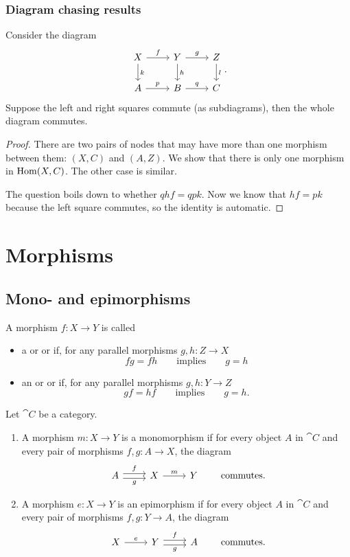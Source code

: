 \subsubsection{Diagram chasing results}
\begin{lemma}
Consider the diagram
\[ \begin{tikzcd}
X \rar{f}\dar{k} & Y \rar{g}\dar{h} & Z\dar{l} \\
A \rar{p} & B \rar{q} & C
\end{tikzcd}. \]
Suppose the left and right squares commute (as subdiagrams), then the whole diagram commutes.
\end{lemma}
\begin{proof}
There are two pairs of nodes that may have more than one morphism between them: $(X,C)$ and $(A,Z)$. We show that there is only one morphism in $\operatorname{Hom}(X,C)$. The other case is similar.

The question boils down to whether $qhf = qpk$. Now we know that $hf = pk$ because the left square commutes, so the identity is automatic.
\end{proof}


\section{Morphisms}
\subsection{Mono- and epimorphisms}
\begin{definition}
A morphism $f: X \to Y$ is called
\begin{itemize}
\item a  or  or  if, for any parallel morphisms $g,h: Z\to X$
\[ fg = fh \qquad \text{implies} \qquad g = h \]
\item an  or  or  if, for any parallel morphisms $g,h: Y\to Z$
\[ gf = hf \qquad \text{implies} \qquad g = h. \]
\end{itemize}
\end{definition}

\begin{lemma}
Let $\cat{C}$ be a category.
\begin{enumerate}
\item A morphism $m:X\to Y$ is a monomorphism if for every object $A$ in $\cat{C}$ and every pair of morphisms $f,g: A\to X$, the diagram
\[ \begin{tikzcd}
A \ar[r, shift left, "f"] \ar[r, shift right, swap, "g"] & X \ar[r, "m"] & Y
\end{tikzcd} \qquad \text{commutes.} \]
\item A morphism $e:X\to Y$ is an epimorphism if for every object $A$ in $\cat{C}$ and every pair of morphisms $f,g: Y\to A$, the diagram
\[ \begin{tikzcd}
X \ar[r, "e"] & Y \ar[r, shift left, "f"] \ar[r, shift right, swap, "g"] & A
\end{tikzcd} \qquad \text{commutes.} \]
\end{enumerate}
\end{lemma}

